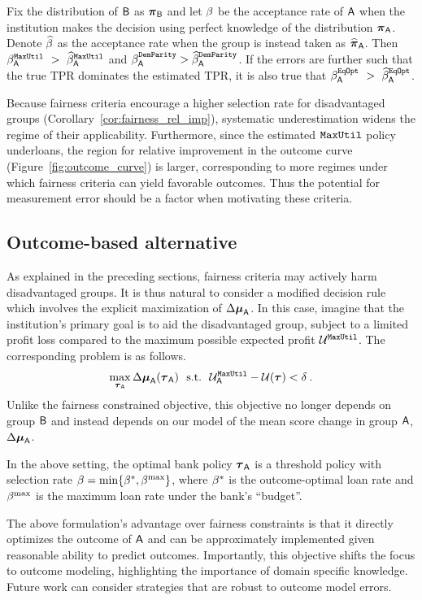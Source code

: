 \begin{prop}\label{prop:underestim}
Fix the distribution of $\mathsf{B}$ as $\boldsymbol{\pi}_{\mathsf{B}}$ and let $\beta$ be the acceptance rate of $\mathsf{A}$ when the institution makes the decision using perfect knowledge of the distribution $\boldsymbol{\pi}_{\mathsf{A}}$. Denote $\widehat{\beta}$ as the acceptance rate when the group is instead taken as $\widehat{\boldsymbol{\pi}}_{\mathsf{A}}$. Then $\beta_{\mathsf{A}}^{\mathtt{MaxUtil}}~>~\widehat{\beta}_{\mathsf{A}}^{\mathtt{MaxUtil}}$ and $\beta_{\mathsf{A}}^{\mathtt{DemParity}}>\widehat{\beta}_{\mathsf{A}}^{\mathtt{DemParity}}$. If the errors are further such that the true TPR dominates the estimated TPR, it is also true that $\beta_{\mathsf{A}}^{\mathtt{EqOpt}}~>~\widehat{\beta}_{\mathsf{A}}^{\mathtt{EqOpt}}$.
\end{prop}

Because fairness criteria encourage a higher selection rate for disadvantaged groups (Corollary~\ref{cor:fairness_rel_imp}), systematic underestimation widens the regime of their applicability. Furthermore, since the estimated $\mathtt{MaxUtil}$ policy underloans, the region for relative improvement in the outcome curve (Figure~\ref{fig:outcome_curve}) is larger, corresponding to more regimes under which fairness criteria can yield favorable outcomes. Thus the potential for measurement error should be a factor when motivating these criteria.


\subsection{Outcome-based alternative} \label{sec:outcome_based}
As explained in the preceding sections, fairness criteria may actively harm disadvantaged groups. It is thus natural to consider a modified decision rule which involves the explicit maximization of $\Delta\boldsymbol{\mu}_{\mathsf{A}}$. In this case, imagine that the institution's primary goal is to aid the disadvantaged group, subject to a limited profit loss compared to the maximum possible expected profit $\mathcal{U}^{\mathtt{MaxUtil}}$. The corresponding problem is as follows.
\begin{align}
\max_{\boldsymbol{\tau}_{\mathsf{A}}} \Delta\boldsymbol{\mu}_{\mathsf{A}}(\boldsymbol{\tau}_{\mathsf{A}})~~\text{s.t.}~~\mathcal{U}_{\mathsf{A}}^{\mathtt{MaxUtil}} - \mathcal{U}(\boldsymbol{\tau}) < \delta\:.
\end{align}
Unlike the fairness constrained objective, this objective no longer depends on group $\mathsf{B}$ and instead depends on our model of the mean score change in group $\mathsf{A}$, $\Delta\boldsymbol{\mu}_{\mathsf{A}}$.
\begin{prop}\label{prop:outcome}
In the above setting, the optimal bank policy $\boldsymbol{\tau}_{\mathsf{A}}$ is a threshold policy with selection rate $\beta = \min\{\beta^*, \beta^{\max}\}$, where $\beta^*$ is the outcome-optimal loan rate and $\beta^{\max}$ is the maximum loan rate under the bank's ``budget''. 
\end{prop}

The above formulation's advantage over fairness constraints is that it directly optimizes the outcome of $\mathsf{A}$ and can be approximately implemented given reasonable ability to predict outcomes. Importantly, this objective shifts the focus to outcome modeling, highlighting the importance of domain specific knowledge. Future work can consider strategies that are robust to outcome model errors.
